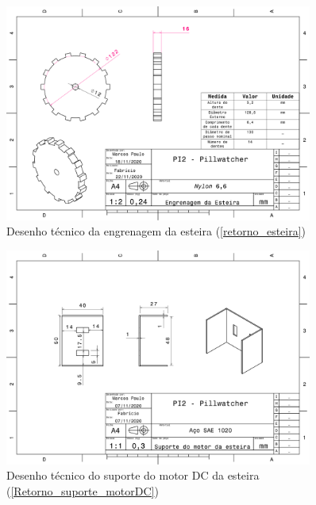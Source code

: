 \begin{apendicesenv}
\begin{figure}[H]
    \centering
    \includegraphics[width=0.9\textwidth]{figuras/estrutura/Desenhos/Engrenagem_Esteira_V2.pdf}
    \caption{Desenho técnico da engrenagem da esteira (\ref{retorno_esteira})}
    \label{fig:engrenagem_esteira}
\end{figure}

\begin{figure}[H]
    \centering
    \includegraphics[width=0.9\textwidth]{figuras/estrutura/Desenhos/Suporte_MotorDC.pdf}
    \caption{Desenho técnico do suporte do motor DC da esteira (\ref{Retorno_suporte_motorDC})}
    \label{fig:supp_motordc}
\end{figure}


\end{apendicesenv}
